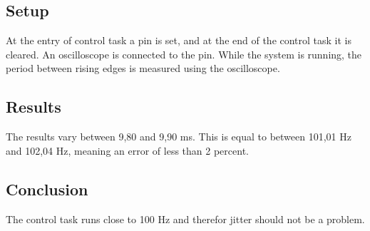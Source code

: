 \subsection*{Setup}
At the entry of control task a pin is set, and at the end of the control task it
is cleared. An oscilloscope is connected to the pin. While the system is running, the period between rising edges is measured using the oscilloscope.

\subsection*{Results}
The results vary between 9,80 and 9,90 ms. This is equal to between 101,01 Hz and 102,04 Hz, meaning an error of less than 2 percent.

\subsection*{Conclusion}
The control task runs close to 100 Hz and therefor jitter should not be a problem.









